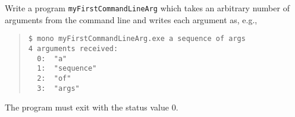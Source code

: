 Write a program \lstinline{myFirstCommandLineArg} which takes an
arbitrary number of arguments from the command line and writes each
argument as, e.g.,
\begin{quote}
  \mbox{\lstinline[language=console]{$ mono myFirstCommandLineArg.exe a sequence of args}}\\
  \mbox{\lstinline[language=console]{4 arguments received:}}\\
  \mbox{\lstinline[language=console]{  0:  "a"}}\\
  \mbox{\lstinline[language=console]{  1:  "sequence"}}\\
  \mbox{\lstinline[language=console]{  2:  "of"}}\\
  \mbox{\lstinline[language=console]{  3:  "args"}}\\
\end{quote}
The program must exit with the status value 0.